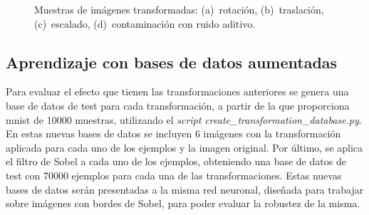 \begin{figure}[H]
	\centering
	 \hspace{10pt}
	 \hspace{10pt}
	 \hspace{10pt}
	\caption{Muestras de imágenes transformadas: (a)~rotación, (b)~traslación, (c)~escalado, (d)~contaminación con ruido aditivo.}
	\label{fig.transformaciones}
\end{figure}

\subsection{Aprendizaje con bases de datos aumentadas} \label{sec.transformaciones}
Para evaluar el efecto que tienen las transformaciones anteriores se genera una base de datos de test para cada transformación, a partir de la que proporciona \acrshort{mnist} de 10000 muestras, utilizando el \textit{script create\_transformation\_database.py}. En estas nuevas bases de datos se incluyen 6 imágenes con la transformación aplicada para cada uno de los ejemplos y la imagen original. Por último, se aplica el filtro de Sobel a cada uno de los ejemplos, obteniendo una base de datos de test con 70000 ejemplos para cada una de las transformaciones. Estas nuevas bases de datos serán presentadas a la misma red neuronal, diseñada para trabajar sobre imágenes con bordes de Sobel, para poder evaluar la robustez de la misma.\\


